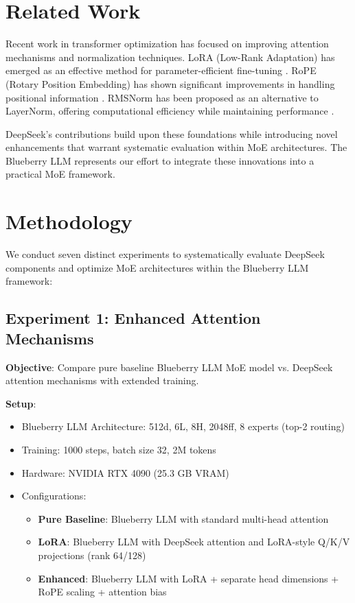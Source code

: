 \documentclass[11pt,a4paper]{article}
\begin{document}
\section{Related Work}

Recent work in transformer optimization has focused on improving attention mechanisms and normalization techniques. LoRA (Low-Rank Adaptation) has emerged as an effective method for parameter-efficient fine-tuning \cite{hu2021lora}. RoPE (Rotary Position Embedding) has shown significant improvements in handling positional information \cite{su2021roformer}. RMSNorm has been proposed as an alternative to LayerNorm, offering computational efficiency while maintaining performance \cite{zhang2019root}.

DeepSeek's contributions build upon these foundations while introducing novel enhancements that warrant systematic evaluation within MoE architectures. The Blueberry LLM represents our effort to integrate these innovations into a practical MoE framework.

\section{Methodology}

We conduct seven distinct experiments to systematically evaluate DeepSeek components and optimize MoE architectures within the Blueberry LLM framework:

\subsection{Experiment 1: Enhanced Attention Mechanisms}

\textbf{Objective}: Compare pure baseline Blueberry LLM MoE model vs. DeepSeek attention mechanisms with extended training.

\textbf{Setup}:
\begin{itemize}
    \item Blueberry LLM Architecture: 512d, 6L, 8H, 2048ff, 8 experts (top-2 routing)
    \item Training: 1000 steps, batch size 32, 2M tokens
    \item Hardware: NVIDIA RTX 4090 (25.3 GB VRAM)
    \item Configurations:
    \begin{itemize}
        \item \textbf{Pure Baseline}: Blueberry LLM with standard multi-head attention
        \item \textbf{LoRA}: Blueberry LLM with DeepSeek attention and LoRA-style Q/K/V projections (rank 64/128)
        \item \textbf{Enhanced}: Blueberry LLM with LoRA + separate head dimensions + RoPE scaling + attention bias
    \end{itemize}
\end{itemize}
\end{document}
